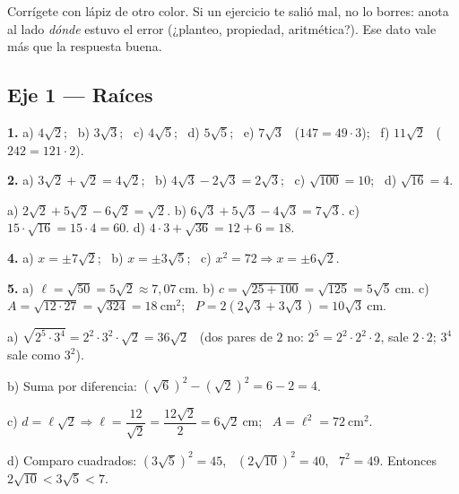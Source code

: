 \documentclass[11pt,a4paper]{article}
\newcounter{ejercicio}
\begin{document}
\begin{tcolorbox}[recuerda, title={\color{black} ANTES DE MIRAR}]
Corrígete con lápiz de otro color. Si un ejercicio te salió mal, no lo borres: anota al lado \emph{dónde} estuvo el error (¿planteo, propiedad, aritmética?). Ese dato vale más que la respuesta buena.
\end{tcolorbox}

\subsection*{Eje 1 --- Raíces}

\begin{tcolorbox}[propiedad, title={Ejercicios 1 y 2}]
\textbf{1.} a) $4\sqrt{2}$; \ b) $3\sqrt{3}$; \ c) $4\sqrt{5}$; \ d) $5\sqrt{5}$; \ e) $7\sqrt{3}$ \ ($147 = 49\cdot 3$); \ f) $11\sqrt{2}$ \ ($242 = 121\cdot 2$).

\smallskip
\textbf{2.} a) $3\sqrt{2} + \sqrt{2} = 4\sqrt{2}$; \ b) $4\sqrt{3} - 2\sqrt{3} = 2\sqrt{3}$; \ c) $\sqrt{100} = 10$; \ d) $\sqrt{16} = 4$.
\end{tcolorbox}

\begin{tcolorbox}[propiedad, title={Ejercicio 3}]
a) $2\sqrt{2} + 5\sqrt{2} - 6\sqrt{2} = \sqrt{2}$. \quad
b) $6\sqrt{3} + 5\sqrt{3} - 4\sqrt{3} = 7\sqrt{3}$. \quad
c) $15\cdot\sqrt{16} = 15\cdot 4 = 60$. \quad
d) $4\cdot 3 + \sqrt{36} = 12 + 6 = 18$.
\end{tcolorbox}

\begin{tcolorbox}[propiedad, title={Ejercicios 4 y 5}]
\textbf{4.} a) $x = \pm 7\sqrt{2}$; \ b) $x = \pm 3\sqrt{5}$; \ c) $x^2 = 72 \Rightarrow x = \pm 6\sqrt{2}$.

\smallskip
\textbf{5.} a) $\ell = \sqrt{50} = 5\sqrt{2} \approx 7{,}07\ \text{cm}$. \quad
b) $c = \sqrt{25 + 100} = \sqrt{125} = 5\sqrt{5}\ \text{cm}$. \quad
c) $A = \sqrt{12\cdot 27} = \sqrt{324} = 18\ \text{cm}^2$; \ $P = 2(2\sqrt{3} + 3\sqrt{3}) = 10\sqrt{3}\ \text{cm}$.
\end{tcolorbox}

\begin{tcolorbox}[propiedad, title={Ejercicio 6 (desafíos)}]
a) $\sqrt{2^5\cdot 3^4} = 2^2\cdot 3^2\cdot\sqrt{2} = 36\sqrt{2}$ \ (dos pares de $2$ no: $2^5 = 2^2\cdot 2^2\cdot 2$, sale $2\cdot 2$; $3^4$ sale como $3^2$).

\smallskip
b) Suma por diferencia: $(\sqrt{6})^2 - (\sqrt{2})^2 = 6 - 2 = 4$.

\smallskip
c) $d = \ell\sqrt{2} \Rightarrow \ell = \dfrac{12}{\sqrt{2}} = \dfrac{12\sqrt{2}}{2} = 6\sqrt{2}\ \text{cm}$; \ $A = \ell^2 = 72\ \text{cm}^2$.

\smallskip
d) Comparo cuadrados: $(3\sqrt{5})^2 = 45$, \ $(2\sqrt{10})^2 = 40$, \ $7^2 = 49$.
Entonces $2\sqrt{10} < 3\sqrt{5} < 7$.
\end{tcolorbox}
\end{document}

